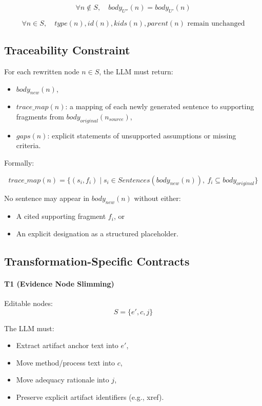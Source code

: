 \documentclass[12pt,twoside,a4paper]{article}
\begin{document}
\[
\forall n \notin S, \quad body_{U''}(n) = body_{U'}(n)
\]

\[
\forall n \in S, \quad type(n), id(n), kids(n), parent(n) \text{ remain unchanged}
\]

\subsection{Traceability Constraint}

For each rewritten node $n \in S$, the LLM must return:

\begin{itemize}
  \item $body_{new}(n)$,
  \item $trace\_map(n)$: a mapping of each newly generated sentence to supporting fragments from $body_{original}(n_{source})$,
  \item $gaps(n)$: explicit statements of unsupported assumptions or missing criteria.
\end{itemize}

Formally:

\[
trace\_map(n) = \{ (s_i, f_i) \mid s_i \in Sentences(body_{new}(n)),\ f_i \subseteq body_{original} \}
\]

No sentence may appear in $body_{new}(n)$ without either:

\begin{itemize}
  \item A cited supporting fragment $f_i$, or
  \item An explicit designation as a structured placeholder.
\end{itemize}

\subsection{Transformation-Specific Contracts}

\paragraph{T1 (Evidence Node Slimming)}

Editable nodes:
\[
S = \{ e', c, j \}
\]

The LLM must:

\begin{itemize}
  \item Extract artifact anchor text into $e'$,
  \item Move method/process text into $c$,
  \item Move adequacy rationale into $j$,
  \item Preserve explicit artifact identifiers (e.g., xref).
\end{itemize}
\end{document}
